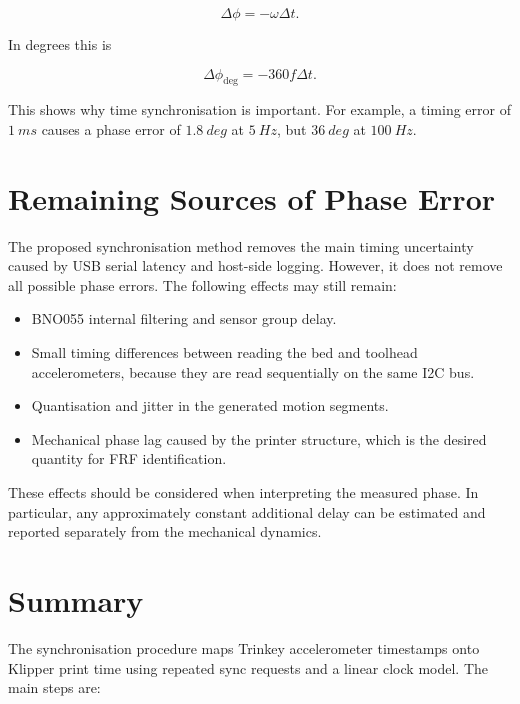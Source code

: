 \documentclass[11pt,a4paper]{article}
\begin{document}
\begin{equation}
    \Delta \phi = -\omega \Delta t.
\end{equation}

In degrees this is

\begin{equation}
    \Delta \phi_{\mathrm{deg}} =
    -360 f \Delta t.
\end{equation}

This shows why time synchronisation is important. For example, a timing error of
\(\SI{1}{ms}\) causes a phase error of \(\SI{1.8}{deg}\) at
\(\SI{5}{Hz}\), but \(\SI{36}{deg}\) at \(\SI{100}{Hz}\).

\section{Remaining Sources of Phase Error}

The proposed synchronisation method removes the main timing uncertainty caused
by USB serial latency and host-side logging. However, it does not remove all
possible phase errors. The following effects may still remain:

\begin{itemize}
    \item BNO055 internal filtering and sensor group delay.
    \item Small timing differences between reading the bed and toolhead
    accelerometers, because they are read sequentially on the same I2C bus.
    \item Quantisation and jitter in the generated motion segments.
    \item Mechanical phase lag caused by the printer structure, which is the
    desired quantity for FRF identification.
\end{itemize}

These effects should be considered when interpreting the measured phase. In
particular, any approximately constant additional delay can be estimated and
reported separately from the mechanical dynamics.

\section{Summary}

The synchronisation procedure maps Trinkey accelerometer timestamps onto
Klipper print time using repeated sync requests and a linear clock model. The
main steps are:
\end{document}
